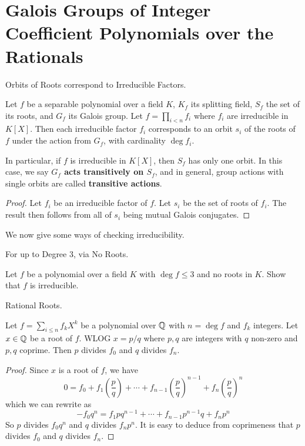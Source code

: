 \documentclass[../book.tex]{subfiles}
\begin{document}
\section{Galois Groups of Integer Coefficient Polynomials over the Rationals}

\begin{thm} Orbits of Roots correspond to Irreducible Factors.
    
    Let $f$ be a separable polynomial over a field $K$,
    $K_f$ its splitting field, $S_f$ the set of its roots, and $G_f$ its Galois group.
    Let $f = \prod_{i<n} f_i$ where $f_i$ are irreducible in $K[X]$.
    Then each irreducible factor $f_i$ corresponds 
    to an orbit $s_i$ of the roots of $f$ under the action from $G_f$,
    with cardinality $\deg f_i$. 
    
    In particular, if $f$ is irreducible in $K[X]$, 
    then $S_f$ has only one orbit. 
    In this case, we say \textbf{$G_f$ acts transitively on $S_f$},
    and in general, group actions with single orbits are called 
    \textbf{transitive actions}. 
    
\end{thm}
\begin{proof}
    
    Let $f_i$ be an irreducible factor of $f$. 
    Let $s_i$ be the set of roots of $f_i$.
    The result then follows from all of $s_i$ being mutual Galois conjugates. 
\end{proof}

We now give some ways of checking irreducibility. 

\begin{ex} For up to Degree 3, via No Roots.
    
    Let $f$ be a polynomial over a field $K$
    with $\deg f \leq 3$ and no roots in $K$. 
    Show that $f$ is irreducible.
    
\end{ex}
\begin{thm} Rational Roots.
    
    Let $f = \sum_{i \leq n} f_k X^k$ be a polynomial over $\mathbb{Q}$ 
    with $n = \deg f$ and $f_k$ integers. 
    Let $x \in \mathbb{Q}$ be a root of $f$. 
    WLOG $x = p/q$ where $p, q$ are integers with $q$ non-zero and $p, q$ coprime. 
    Then $p$ divides $f_0$ and $q$ divides $f_{n}$. 
    
\end{thm}
\begin{proof}
    
    Since $x$ is a root of $f$, we have \[
        0 = f_0 + f_1 \left( \frac{p}{q} \right) + \cdots 
        + f_{n-1} \left( \frac{p}{q} \right)^{n-1}
        + f_n \left( \frac{p}{q} \right)^n
    \]
    which we can rewrite as    
    \[
        - f_0 q^{n} = f_1 p q^{n - 1} + \cdots 
        + f_{n - 1} p^{n - 1} q + f_{n} p^{n}
    \]
    So $p$ divides $f_0 q^n$ and $q$ divides $f_n p^n$. 
    It is easy to deduce from coprimeness that 
    $p$ divides $f_0$ and $q$ divides $f_n$.
    
\end{proof}
\end{document}
